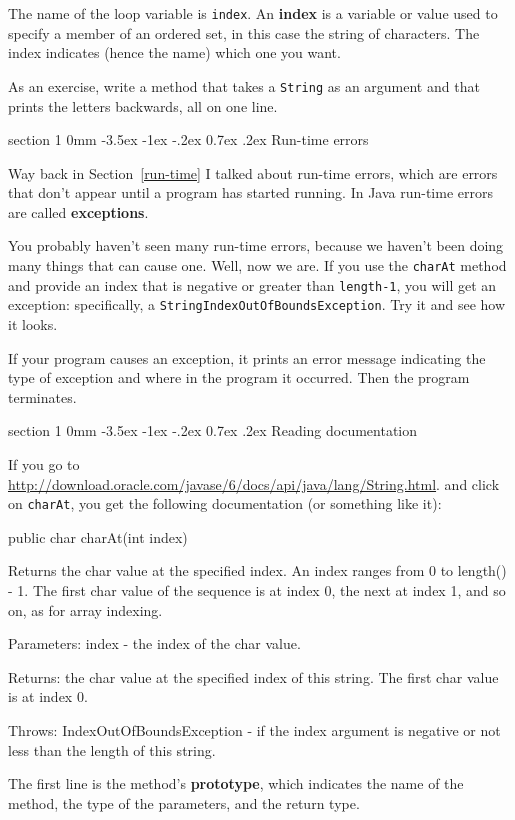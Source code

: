 \documentclass{book}
\makeatletter
\renewcommand{\section}{\@startsection 
    {section} {1} {0mm}%
    {-3.5ex \@plus -1ex \@minus -.2ex}%
    {0.7ex \@plus.2ex}%
    {\normalfont\Large\bfseries}}
\makeatother
\begin{document}

The name of the loop variable is {\tt index}.  An {\bf
index} is a variable or value used to specify a member of an ordered
set, in this case the string of characters.  The index
indicates (hence the name) which one you want.

As an exercise, write a method that takes a {\tt String}
as an argument and that prints the letters backwards, all on
one line.


\section{Run-time errors}

Way back in Section~\ref{run-time} I talked about run-time errors,
which are errors that don't appear until a program has started
running.  In Java run-time errors are called {\bf exceptions}.

You probably haven't seen many run-time errors, because we
haven't been doing many things that can cause one.  Well, now we are.
If you use the {\tt charAt} method and provide an index that is
negative or greater than {\tt length-1}, you will get an exception:
specifically, a {\tt StringIndexOutOfBoundsException}.  Try it
and see how it looks.

If your program causes an exception, it prints an error message
indicating the type of exception and where in the program it
occurred.  Then the program terminates.


\section{Reading documentation}

If you go to
\url{http://download.oracle.com/javase/6/docs/api/java/lang/String.html}.
and click on {\tt charAt}, you get the following documentation
(or something like it):

\begin{verbatimtab}
public char charAt(int index)

Returns the char value at the specified index. An index ranges from 0
to length() - 1. The first char value of the sequence is at index 0,
the next at index 1, and so on, as for array indexing.

Parameters: index - the index of the char value.

Returns: the char value at the specified index of this string. The
  first char value is at index 0.

Throws: IndexOutOfBoundsException - if the index argument is negative
  or not less than the length of this string.
\end{verbatimtab}
%
The first line is the method's {\bf prototype}, which indicates the
name of the method, the type of the parameters, and the return type.
\end{document}
